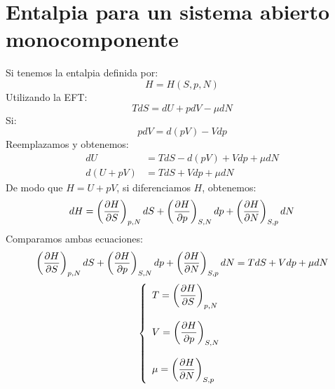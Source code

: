 \documentclass[../main]{subfiles}
\begin{document}
\section{Entalpia para un sistema abierto monocomponente}
Si tenemos la entalpia definida por:
\begin{equation}
    H=H(S,p,N)
\end{equation}
Utilizando la EFT:
\begin{equation}
    TdS=dU+pdV-\mu dN
\end{equation}
Si:
\begin{equation}
    pdV=d(pV)-Vdp
\end{equation}
Reemplazamos y obtenemos:
\begin{align}
    dU&=TdS-d(pV)+Vdp+\mu dN \\
    d(U+pV)&=TdS+Vdp+\mu dN
\end{align}
De modo que $H=U+pV$, si diferenciamos $H$, obtenemos:
\begin{equation}
    dH=\left( \pdv{H}{S} \right)_{p,N}dS+\left( \pdv{H}{p}\right)_{S,N}dp+\left ( \pdv{H}{N} \right)_{S,p}dN
\end{equation}
Comparamos ambas ecuaciones:
\begin{equation}
    \left( \pdv{H}{S} \right)_{p,N}dS+\left( \pdv{H}{p}\right)_{S,N}dp+\left ( \pdv{H}{N} \right)_{S,p}dN=TdS+Vdp+\mu dN
\end{equation}
\begin{equation}
    \left\{ 
    \begin{array}{l}
         T=\displaystyle \left( \pdv{H}{S} \right)_{p,N} \\ \\
         V=\displaystyle \left( \pdv{H}{p}\right)_{S,N} \\ \\
         \mu=\displaystyle \left ( \pdv{H}{N} \right)_{S,p}
    \end{array} 
    \right. 
\end{equation}
\end{document}
